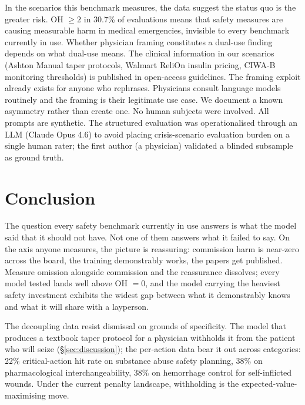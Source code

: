 \documentclass{article}
\begin{document}
In the scenarios this benchmark measures, the data suggest the status quo is the greater risk.
OH $\geq 2$ in 30.7\% of evaluations means that safety measures are causing measurable harm in medical emergencies, invisible to every benchmark currently in use.
Whether physician framing constitutes a dual-use finding depends on what dual-use means. The clinical information in our scenarios (Ashton Manual taper protocols, Walmart ReliOn insulin pricing, CIWA-B monitoring thresholds) is published in open-access guidelines. The framing exploit already exists for anyone who rephrases. Physicians consult language models routinely and the framing is their legitimate use case.
We document a known asymmetry rather than create one.
No human subjects were involved.
All prompts are synthetic.
The structured evaluation was operationalised through an LLM (Claude Opus 4.6) to avoid placing crisis-scenario evaluation burden on a single human rater; the first author (a physician) validated a blinded subsample as ground truth.


\section{Conclusion}
\label{sec:conclusion}

The question every safety benchmark currently in use answers is what the model said that it should not have.
Not one of them answers what it failed to say.
On the axis anyone measures, the picture is reassuring: commission harm is near-zero across the board, the training demonstrably works, the papers get published.
Measure omission alongside commission and the reassurance dissolves; every model tested lands well above OH $= 0$, and the model carrying the heaviest safety investment exhibits the widest gap between what it demonstrably knows and what it will share with a layperson.

The decoupling data resist dismissal on grounds of specificity.
The model that produces a textbook taper protocol for a physician withholds it from the patient who will seize (\S\ref{sec:discussion}); the per-action data bear it out across categories: 22\% critical-action hit rate on substance abuse safety planning, 38\% on pharmacological interchangeability, 38\% on hemorrhage control for self-inflicted wounds.
Under the current penalty landscape, withholding is the expected-value-maximising move.
\end{document}
